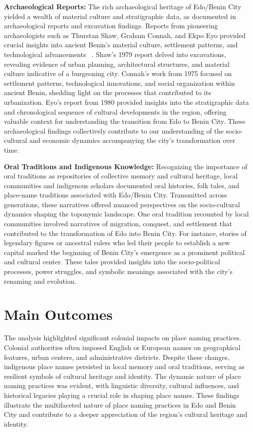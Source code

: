 \textbf{Archaeological Reports:} The rich archaeological heritage of Edo/Benin City yielded a wealth of material culture and stratigraphic data, as documented in archaeological reports and excavation findings. Reports from pioneering archaeologists such as Thurstan Shaw, Graham Connah, and Ekpo Eyo provided crucial insights into ancient Benin's material culture, settlement patterns, and technological advancements ~\cite{shaw1970,connah1975}. Shaw's 1979 report delved into excavations, revealing evidence of urban planning, architectural structures, and material culture indicative of a burgeoning city. Connah's work from 1975 focused on settlement patterns, technological innovations, and social organization within ancient Benin, shedding light on the processes that contributed to its urbanization. Eyo's report from 1980 provided insights into the stratigraphic data and chronological sequence of cultural developments in the region, offering valuable context for understanding the transition from Edo to Benin City. These archaeological findings collectively contribute to our understanding of the socio-cultural and economic dynamics accompanying the city's transformation over time.

\textbf{Oral Traditions and Indigenous Knowledge:} Recognizing the importance of oral traditions as repositories of collective memory and cultural heritage, local communities and indigenous scholars documented oral histories, folk tales, and place-name traditions associated with Edo/Benin City. Transmitted across generations, these narratives offered nuanced perspectives on the socio-cultural dynamics shaping the toponymic landscape. One oral tradition recounted by local communities involved narratives of migration, conquest, and settlement that contributed to the transformation of Edo into Benin City. For instance, stories of legendary figures or ancestral rulers who led their people to establish a new capital marked the beginning of Benin City's emergence as a prominent political and cultural center. These tales provided insights into the socio-political processes, power struggles, and symbolic meanings associated with the city's renaming and evolution.

\section{Main Outcomes}

The analysis highlighted significant colonial impacts on place naming practices. Colonial authorities often imposed English or European names on geographical features, urban centers, and administrative districts. Despite these changes, indigenous place names persisted in local memory and oral traditions, serving as resilient symbols of cultural heritage and identity. The dynamic nature of place naming practices was evident, with linguistic diversity, cultural influences, and historical legacies playing a crucial role in shaping place names. These findings illustrate the multifaceted nature of place naming practices in Edo and Benin City and contribute to a deeper appreciation of the region's cultural heritage and identity.

